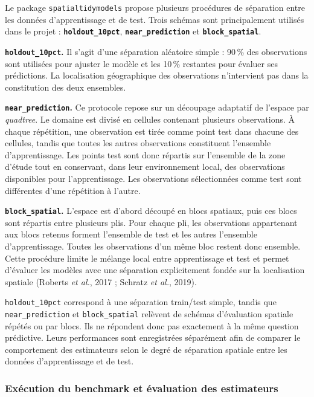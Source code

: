 \documentclass[11pt,a4paper]{article}
\begin{document}
Le package \texttt{spatialtidymodels} propose plusieurs procédures de séparation entre les données d'apprentissage et de test. Trois schémas sont principalement utilisés dans le projet : \textbf{\texttt{holdout\_10pct}}, \textbf{\texttt{near\_prediction}} et \textbf{\texttt{block\_spatial}}.

\textbf{\texttt{holdout\_10pct}.}
Il s'agit d'une séparation aléatoire simple : 90\,\% des observations sont utilisées pour ajuster le modèle et les 10\,\% restantes pour évaluer ses prédictions. La localisation géographique des observations n'intervient pas dans la constitution des deux ensembles.

\textbf{\texttt{near\_prediction}.}
Ce protocole repose sur un découpage adaptatif de l'espace par \textit{quadtree}. Le domaine est divisé en cellules contenant plusieurs observations. À chaque répétition, une observation est tirée comme point test dans chacune des cellules, tandis que toutes les autres observations constituent l'ensemble d'apprentissage. Les points test sont donc répartis sur l'ensemble de la zone d'étude tout en conservant, dans leur environnement local, des observations disponibles pour l'apprentissage. Les observations sélectionnées comme test sont différentes d'une répétition à l'autre.

\textbf{\texttt{block\_spatial}.}
L'espace est d'abord découpé en blocs spatiaux, puis ces blocs sont répartis entre plusieurs plis. Pour chaque pli, les observations appartenant aux blocs retenus forment l'ensemble de test et les autres l'ensemble d'apprentissage. Toutes les observations d'un même bloc restent donc ensemble. Cette procédure limite le mélange local entre apprentissage et test et permet d'évaluer les modèles avec une séparation explicitement fondée sur la localisation spatiale (Roberts \textit{et al.}, 2017 ; Schratz \textit{et al.}, 2019).

\texttt{holdout\_10pct} correspond à une séparation train/test simple, tandis que \texttt{near\_prediction} et \texttt{block\_spatial} relèvent de schémas d'évaluation spatiale répétés ou par blocs. Ils ne répondent donc pas exactement à la même question prédictive. Leurs performances sont enregistrées séparément afin de comparer le comportement des estimateurs selon le degré de séparation spatiale entre les données d'apprentissage et de test.

\subsubsection{Exécution du benchmark et évaluation des estimateurs}
\end{document}
